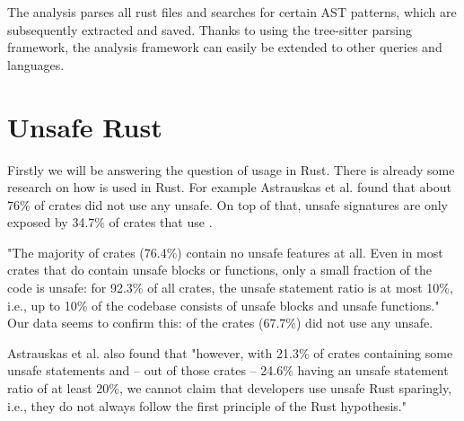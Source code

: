 \documentclass[twoside, english, final]{sdqthesis}
\theoremstyle{definition}
\begin{document}

The analysis parses all rust files and searches for certain AST patterns, which are subsequently extracted and saved.
Thanks to using the tree-sitter parsing framework, the analysis framework can easily be extended to other queries and languages.

\section{Unsafe Rust}\label{ss:unsafe-rust}

Firstly we will be answering the question of  usage in Rust.
There is already some research on how  is used in Rust. For example Astrauskas et al. \cite{astrauskas_how_2020} found that about 76\% of crates did not use any unsafe. On top of that, unsafe signatures are only exposed by 34.7\% of crates that use .

"The majority of crates (76.4\%) contain no unsafe features at all. Even in most crates that do contain unsafe blocks or functions, only a small fraction of the code is unsafe: for 92.3\% of all crates, the unsafe statement ratio is at most 10\%, i.e., up to 10\% of the codebase consists of unsafe blocks and unsafe functions." \cite[p. 13]{astrauskas_how_2020}
Our data seems to confirm this:  of the  crates (67.7\%) did not use any unsafe. 

Astrauskas et al. also found that "however, with 21.3\% of crates containing some unsafe statements and – out of those crates – 24.6\% having an unsafe statement ratio of at least 20\%, we cannot claim that developers use unsafe Rust sparingly, i.e., they do not always follow the first principle of the Rust hypothesis." \cite[p. 14]{astrauskas_how_2020}
\end{document}
